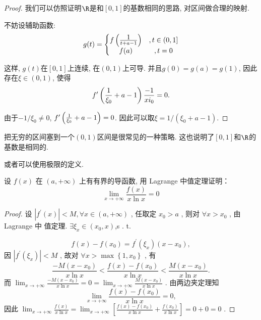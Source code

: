 \begin{proof}
    我们可以仿照证明$\R$是和$[0,1]$的基数相同的思路, 对区间做合理的映射. 

    不妨设辅助函数: 
    $$
    g(t)=\left\{\begin{matrix} 
        f\left({\displaystyle 1\over t+a-1}\right)&, t\in (0,1] \\  
        f(a)&, t=0
      \end{matrix}\right. 
    $$

    这样, $g(t)$在$[0,1]$上连续, 在$(0,1)$上可导. 并且$g(0)=g(a)=g(1)$, 因此存在$\xi\in(0,1)$, 使得
    $$
    f'\left({1\over \xi_0} +a-1\right) {-1\over xi_0}=0.
    $$

    由于$-1/\xi_0\neq 0$, $f'\left({1\over \xi_0} +a-1\right)=0$. 因此可以取$\xi=1/(\xi_0+a-1)$. 

\end{proof}


\begin{remark}
    把无穷的区间塞到一个$(0,1)$区间是很常见的一种策略. 这也说明了$[0,1]$和$\R$的基数是相同的. 
\end{remark}

或者可以使用极限的定义. 


\begin{prob} 

    设  $f(x)$  在  $(a,+\infty)$  上有有界的导函数, 用 Lagrange 中值定理证明：
$$
\lim _{x \rightarrow+\infty} \frac{f(x)}{x \ln x}=0
$$

\end{prob} 

\begin{proof}
    设  $\left|f^{\prime}(x)\right|<M, \forall x \in(a,+\infty)$ , 任取定  $x_{0}>a$ , 则对  $\forall x>x_{0}$ , 由 Lagrange 中 值定理.  $\exists \xi_{x} \in\left(x_{0}, x\right)$,s . t.

$$
f(x)-f\left(x_{0}\right)=f^{\prime}\left(\xi_{x}\right)\left(x-x_{0}\right),
$$
因  $\left|f^{\prime}\left(\xi_{x}\right)\right|<M$ , 故对  $\forall x>\max \left\{1, x_{0}\right\}$ , 有
$$
\frac{-M\left(x-x_{0}\right)}{x \ln x}<\frac{f(x)-f\left(x_{0}\right)}{x \ln x}<\frac{M\left(x-x_{0}\right)}{x \ln x} .
$$
而  $\lim _{x \rightarrow+\infty} \frac{-M\left(x-x_{0}\right)}{x \ln x}=0=\lim _{x \rightarrow+\infty} \frac{M\left(x-x_{0}\right)}{x \ln x}$ . 由两边夹定理知
$$
\lim _{x \rightarrow+\infty} \frac{f(x)-f\left(x_{0}\right)}{x \ln x}=0,
$$
因此  $\lim _{x \rightarrow+\infty} \frac{f(x)}{x \ln x}=\lim _{x \rightarrow+\infty}\left[\frac{f(x)-f\left(x_{0}\right)}{x \ln x}+\frac{f\left(x_{0}\right)}{x \ln x}\right]=0+0=0$ .
\end{proof}





